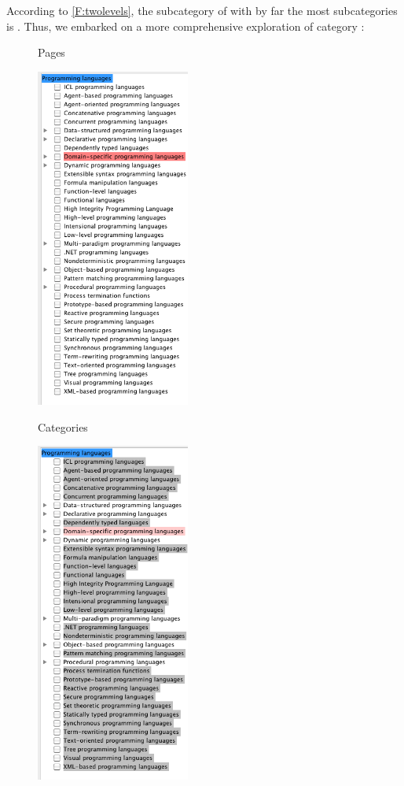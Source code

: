 According to \autoref{F:twolevels}, the subcategory of  with by far the most subcategories is 
. Thus, we embarked on a more comprehensive exploration of category :


\begin{figure}[t!]
\parbox{.48\textwidth}{
Pages

\noindent 
\includegraphics[width=0.45\textwidth]{figures/plPagesTransitive.png}
}\hfill\parbox{.48\textwidth}{

Categories 

\noindent \includegraphics[width=0.45\textwidth]{figures/plSubcategoriesTransitive.png}
}


\end{figure}
